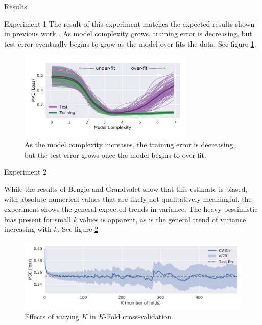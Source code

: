 \documentclass[onecolumn,abstract,paper=letter]{scrartcl}
\begin{document}
\begin{section}{Results}

\begin{subsection}{Experiment 1}
The result of this experiment matches the expected results shown in previous work \cite{hastie2009}.
As model complexity grows, training error is decreasing, but test error eventually begins to grow as the model over-fits the data.
See figure \ref{fig:train_test}.

\begin{figure}[ht]
    \centering
    \includegraphics[width=0.75\textwidth]{plots/b-v+.pdf}
    \caption{As the model complexity increases, the training error is decreasing, but the test error grows once the model begins to over-fit.}
    \label{fig:train_test}
\end{figure}

\end{subsection}

\begin{subsection}{Experiment 2}

While the results of Bengio and Grandvalet \cite{bengio2004} show that this estimate is biased, with absolute numerical values that are likely not qualitatively meaningful, the experiment shows the general expected trends in variance.
The heavy pessimistic bias present for small $k$ values is apparent, as is the general trend of variance increasing with $k$. See figure \ref{fig:kfold-cv}

\begin{figure}[ht]
    \centering
    \includegraphics[width=\textwidth]{plots/kfold-cv-std-8x3.pdf}
    \caption{Effects of varying $K$ in $K$-Fold cross-validation.}
    \label{fig:kfold-cv}
\end{figure}
\end{subsection}


\end{section}
\end{document}

